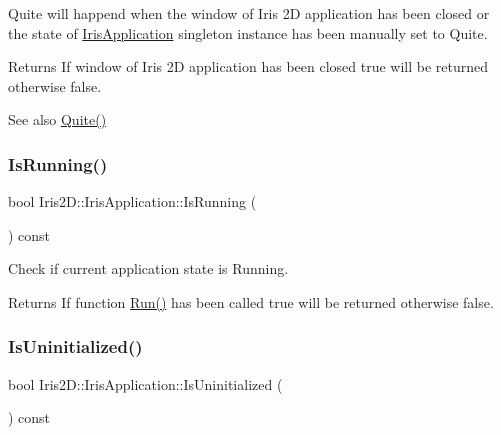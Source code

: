 Quite will happend when the window of Iris 2D application has been closed or the state of \hyperlink{class_iris2_d_1_1_iris_application}{Iris\+Application} singleton instance has been manually set to Quite. \begin{DoxyReturn}{Returns}
If window of Iris 2D application has been closed true will be returned otherwise false. 
\end{DoxyReturn}
\begin{DoxySeeAlso}{See also}
\hyperlink{class_iris2_d_1_1_iris_application_adca8cada1a8841c3f409e856f6878331}{Quite()} 
\end{DoxySeeAlso}
\mbox{\label{class_iris2_d_1_1_iris_application_a795cea1f5d8112a7db7d6429f306a5ff}} 
\subsubsection{\texorpdfstring{Is\+Running()}{IsRunning()}}
{\footnotesize\ttfamily bool Iris2\+D\+::\+Iris\+Application\+::\+Is\+Running (\begin{DoxyParamCaption}{ }\end{DoxyParamCaption}) const}



Check if current application state is Running. 

\begin{DoxyReturn}{Returns}
If function \hyperlink{class_iris2_d_1_1_iris_application_ae6bb59365978c945201fd8cf82105e4f}{Run()} has been called true will be returned otherwise false. 
\end{DoxyReturn}
\mbox{\label{class_iris2_d_1_1_iris_application_a1035e03a186b934ecf57371e42475eea}} 
\subsubsection{\texorpdfstring{Is\+Uninitialized()}{IsUninitialized()}}
{\footnotesize\ttfamily bool Iris2\+D\+::\+Iris\+Application\+::\+Is\+Uninitialized (\begin{DoxyParamCaption}{ }\end{DoxyParamCaption}) const}



